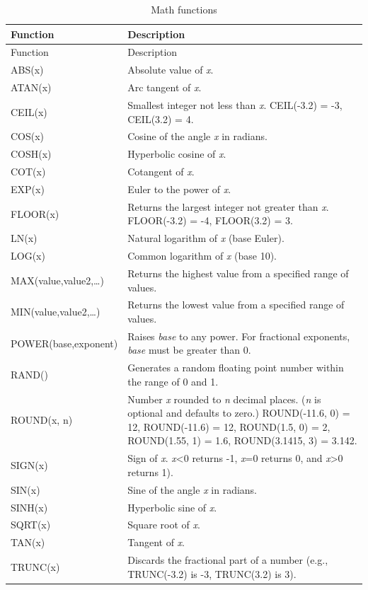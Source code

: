 \documentclass[
]{book}
\theoremstyle{definition}
\theoremstyle{definition}
\theoremstyle{definition}
\theoremstyle{definition}
\theoremstyle{remark}
\begin{document}
\begin{minipage}{\textwidth}

\begin{longtable}[]{@{}
  >{\raggedright\arraybackslash}p{}
  >{\raggedright\arraybackslash}p{}@{}}
\caption{Math functions}\tabularnewline
\toprule
Function & Description \\
\midrule
\endfirsthead
\toprule
Function & Description \\
\midrule
\endhead
ABS(x) & Absolute value of \emph{x}. \\
ATAN(x) & Arc tangent of \emph{x}. \\
CEIL(x) & Smallest integer not less than \emph{x}. CEIL(-3.2) = -3, CEIL(3.2) = 4. \\
COS(x) & Cosine of the angle \emph{x} in radians. \\
COSH(x) & Hyperbolic cosine of \emph{x}. \\
COT(x) & Cotangent of \emph{x}. \\
EXP(x) & Euler to the power of \emph{x}. \\
FLOOR(x) & Returns the largest integer not greater than \emph{x}. FLOOR(-3.2) = -4, FLOOR(3.2) = 3. \\
LN(x) & Natural logarithm of \emph{x} (base Euler). \\
LOG(x) & Common logarithm of \emph{x} (base 10). \\
MAX(value,value2,\ldots) & Returns the highest value from a specified range of values. \\
MIN(value,value2,\ldots) & Returns the lowest value from a specified range of values. \\
POWER(base,exponent) & Raises \emph{base} to any power. For fractional exponents, \emph{base} must be greater than 0. \\
RAND() & Generates a random floating point number within the range of 0 and 1. \\
ROUND(x, n) & Number \emph{x} rounded to \emph{n} decimal places. (\emph{n} is optional and defaults to zero.) ROUND(-11.6, 0) = 12, ROUND(-11.6) = 12, ROUND(1.5, 0) = 2, ROUND(1.55, 1) = 1.6, ROUND(3.1415, 3) = 3.142. \\
SIGN(x) & Sign of \emph{x}. \emph{x}\textless0 returns -1, \emph{x}=0 returns 0, and \emph{x}\textgreater0 returns 1). \\
SIN(x) & Sine of the angle \emph{x} in radians. \\
SINH(x) & Hyperbolic sine of \emph{x}. \\
SQRT(x) & Square root of \emph{x}. \\
TAN(x) & Tangent of \emph{x}. \\
TRUNC(x) & Discards the fractional part of a number (e.g., TRUNC(-3.2) is -3, TRUNC(3.2) is 3). \\
\bottomrule
\end{longtable}

\end{minipage}
\end{document}
